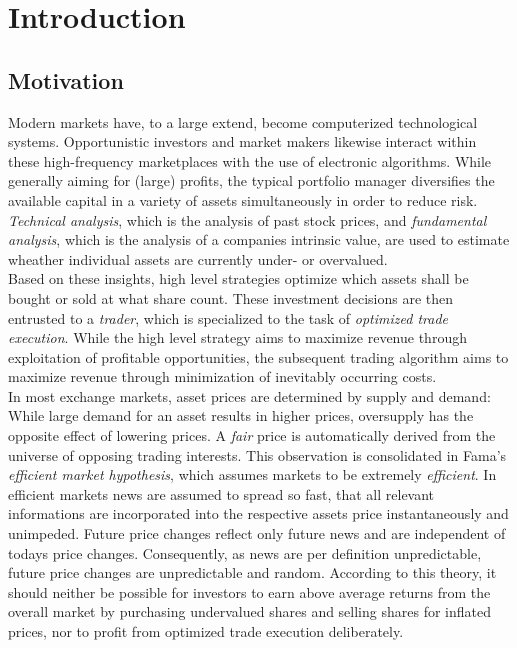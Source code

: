 \chapter{Introduction}
\label{chap:introduction}
\section{Motivation} 
\label{sec:motivation}
Modern markets have, to a large extend, become computerized technological systems. Opportunistic investors and market makers likewise interact within these high-frequency marketplaces with the use of electronic algorithms. While generally aiming for (large) profits, the typical portfolio manager diversifies the available capital in a variety of assets simultaneously in order to reduce risk. \emph{Technical analysis}, which is the analysis of past stock prices, and \emph{fundamental analysis}, which is the analysis of a companies intrinsic value, are used to estimate wheather individual assets are currently under- or overvalued.\\

Based on these insights, high level strategies optimize which assets shall be bought or sold at what share count. These investment decisions are then entrusted to a \emph{trader}, which is specialized to the task of \emph{optimized trade execution}. While the high level strategy aims to maximize revenue through exploitation of profitable opportunities, the subsequent trading algorithm aims to maximize revenue through minimization of inevitably occurring costs.\\

In most exchange markets, asset prices are determined by supply and demand: While large demand for an asset results in higher prices, oversupply has the opposite effect of lowering prices. A \emph{fair} price is automatically derived from the universe of opposing trading interests. This observation is consolidated in Fama's \emph{efficient market hypothesis}\Cite{Fama70efficientcapital}, which assumes markets to be extremely \emph{efficient}. In efficient markets news are assumed to spread so fast, that all relevant informations are incorporated into the respective assets price instantaneously and unimpeded. Future price changes reflect only future news and are independent of todays price changes. Consequently, as news are per definition unpredictable, future price changes are unpredictable and random. According to this theory, it should neither be possible for investors to earn above average returns from the overall market by purchasing undervalued shares and selling shares for inflated prices, nor to profit from optimized trade execution deliberately.\\

